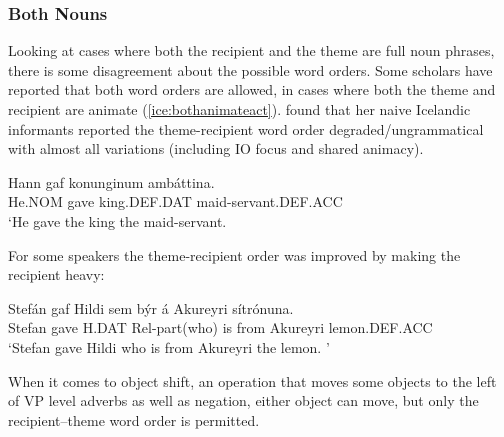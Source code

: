 \subsubsection{Both Nouns}
Looking at cases where both the recipient and the theme are full noun phrases, there is some disagreement about the possible word orders. Some scholars have reported that both word orders are allowed, in cases where both the theme and recipient are animate (\ref{ice:bothanimateact}). \cite{Dehe.2004} found that her naive Icelandic informants reported the theme-recipient word order degraded/ungrammatical with almost all variations (including IO focus and shared animacy). 
\begin{exe}
\ex\label{ice:bothanimateact}
\begin{xlist}
\ex \gll Hann gaf konunginum ambáttina.\\
He.NOM gave king.DEF.DAT maid-servant.DEF.ACC\\
\trans `He gave the king the maid-servant. \citep[ex 14a]{Dehe.2004}
\end{xlist}
\end{exe}
For some speakers the theme-recipient order was improved by making the recipient heavy:
\begin{exe}
\ex
\begin{xlist}
\ex \gll Stefán gaf Hildi sem býr á Akureyri sítrónuna. \\
Stefan gave H.DAT Rel-part(who) is from Akureyri lemon.DEF.ACC\\
\trans `Stefan gave Hildi who is from Akureyri the lemon. \citep[ex 16b]{Dehe.2004}'
\end{xlist}
\end{exe}
When it comes to object shift, an operation that moves some objects to the left of VP level adverbs as well as negation, either object can move, but only the recipient--theme word order is permitted.
